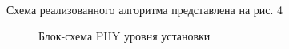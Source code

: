 \documentclass{llncs}
\begin{document}
\\
Схема реализованного алгоритма представлена на рис. 4
\begin{figure}[htp!]
\caption{Блок-схема PHY уровня установки}
\label{ris:image}
\end{figure}
\end{document}
